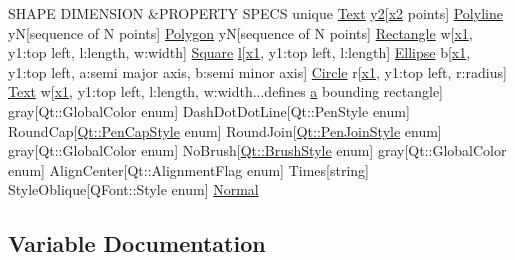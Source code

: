 \begin{DoxyCompactItemize}
S\+H\+A\+PE D\+I\+M\+E\+N\+S\+I\+ON \&P\+R\+O\+P\+E\+R\+TY S\+P\+E\+CS unique \hyperlink{classText}{Text} \hyperlink{shape__input__file__specs_8txt_a87b0346d2b040fbc73601f3fd8171852}{y2}\mbox{[}\hyperlink{shape__input__file__specs_8txt_a9f1fa2fb07ac3e1d8394274cb160df5c}{x2} points\mbox{]} \hyperlink{classPolyline}{Polyline} yN\mbox{[}sequence of N points\mbox{]} \hyperlink{classPolygon}{Polygon} yN\mbox{[}sequence of N points\mbox{]} \hyperlink{classRectangle}{Rectangle} w\mbox{[}\hyperlink{shape__input__file__specs_8txt_a2c75107475dd4c72dd2083af2e04d090}{x1}, y1\+:top left, l\+:length, w\+:width\mbox{]} \hyperlink{classSquare}{Square} \hyperlink{shape__input__file__specs_8txt_a2e02238fe11bc76d2a69c565c7391545}{l}\mbox{[}\hyperlink{shape__input__file__specs_8txt_a2c75107475dd4c72dd2083af2e04d090}{x1}, y1\+:top left, l\+:length\mbox{]} \hyperlink{classEllipse}{Ellipse} b\mbox{[}\hyperlink{shape__input__file__specs_8txt_a2c75107475dd4c72dd2083af2e04d090}{x1}, y1\+:top left, a\+:semi major axis, b\+:semi minor axis\mbox{]} \hyperlink{classCircle}{Circle} r\mbox{[}\hyperlink{shape__input__file__specs_8txt_a2c75107475dd4c72dd2083af2e04d090}{x1}, y1\+:top left, r\+:radius\mbox{]} \hyperlink{classText}{Text} w\mbox{[}\hyperlink{shape__input__file__specs_8txt_a2c75107475dd4c72dd2083af2e04d090}{x1}, y1\+:top left, l\+:length, w\+:width...\+defines \hyperlink{shape__input__file__specs_8txt_ae28cf074afc52317b2105a81fa268a8c}{a} bounding rectangle\mbox{]} gray\mbox{[}Qt\+::\+Global\+Color enum\mbox{]} Dash\+Dot\+Dot\+Line\mbox{[}Qt\+::\+Pen\+Style enum\mbox{]} Round\+Cap\mbox{[}\hyperlink{shape__input__file__specs_8txt_a622efdcfef6789d4367974d2fe79019e}{Qt\+::\+Pen\+Cap\+Style} enum\mbox{]} Round\+Join\mbox{[}\hyperlink{shape__input__file__specs_8txt_a007db2043c6063881de2043c05c9c4a9}{Qt\+::\+Pen\+Join\+Style} enum\mbox{]} gray\mbox{[}Qt\+::\+Global\+Color enum\mbox{]} No\+Brush\mbox{[}\hyperlink{shape__input__file__specs_8txt_ad07f6fe6c28dcb0b3bdc324a72d0051f}{Qt\+::\+Brush\+Style} enum\mbox{]} gray\mbox{[}Qt\+::\+Global\+Color enum\mbox{]} Align\+Center\mbox{[}Qt\+::\+Alignment\+Flag enum\mbox{]} Times\mbox{[}string\mbox{]} Style\+Oblique\mbox{[}Q\+Font\+::\+Style enum\mbox{]} \hyperlink{shape__input__file__specs_8txt_a0c0bd83f93fb282ea2b33e44c2f3cc34}{Normal}
\end{DoxyCompactItemize}


\subsection{Variable Documentation}
